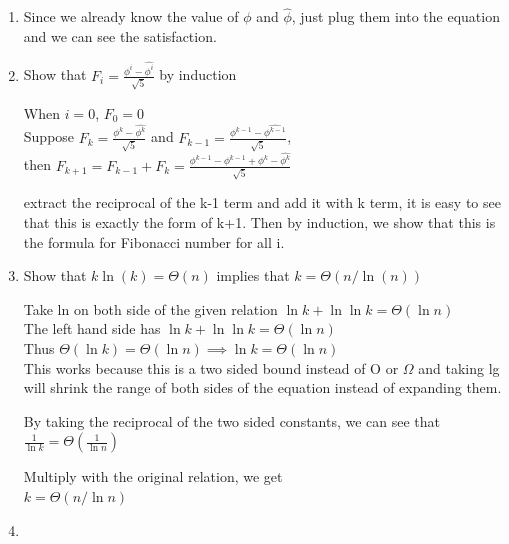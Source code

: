 \documentclass[]{article}
\begin{document}
\begin{enumerate}
\item[3.2-6] Since we already know the value of $\phi$ and $\hat{\phi}$, just plug them into the equation and we can see the satisfaction.

\item[3.2-7] Show that $ F_i = \frac{\phi^i-\hat{\phi^i}}{\sqrt{5}} $ by induction

When $i=0$, $F_0 = 0$\\
Suppose $ F_k =  \frac{\phi^k-\hat{\phi^k}}{\sqrt{5}} $ and $ F_{k-1} =  \frac{\phi^{k-1}-\hat{\phi^{k-1}}}{\sqrt{5}} $, \\then 
$F_{k+1} = F_{k-1} + F_k = \frac{\phi^{k-1}-\hat{\phi^{k-1}} + \phi^k-\hat{\phi^k}}{\sqrt{5}} $

extract the reciprocal of the k-1 term and add it with k term, it is easy to see that this is exactly the form of k+1. Then by induction, we show that this is the formula for Fibonacci number for all i.

\item[3.2-8] Show that $ k\ln(k) = \Theta(n) $ implies that $ k=\Theta(n/\ln(n)) $

Take ln on both side of the given relation
$ \ln k + \ln\ln k = \Theta(\ln n) $\\
The left hand side has $ \ln k+\ln\ln k = \Theta(\ln n) $\\
Thus $ \Theta(\ln k) = \Theta(\ln n) \implies \ln k= \Theta (\ln n) $\\
This works because this is a two sided bound instead of O or $\Omega$ and taking lg will shrink the range of both sides of the equation instead of expanding them.

By taking the reciprocal of the two sided constants, we can see that\\
 $ \frac{1}{\ln k} = \Theta(\frac{1}{\ln n}) $

Multiply with the original relation, we get\\
$ k = \Theta(n/ \ln n) $

\item[3-1]
\end{enumerate}
\end{document}
